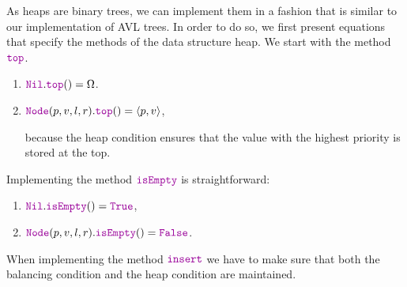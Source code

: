 As heaps are binary trees, we can implement them in a fashion that is similar to our implementation
of AVL trees.  In order to do so, we first present equations that specify the methods of the data
structure heap.  We start with the method $\mytt{top}$.  
\begin{enumerate}
\item $\mytt{Nil}.\mytt{top}() = \Omega$.
\item $\mytt{Node}(p,v,l,r).\mytt{top}() = \pair(p,v)$,

      because the heap condition ensures that the value with the highest priority is stored at the
      top. 
\end{enumerate}
Implementing the method $\mytt{isEmpty}$ is straightforward:
\begin{enumerate}
\item $\mytt{Nil}.\mytt{isEmpty}() = \mytt{True}$,
\item $\mytt{Node}(p,v,l,r).\mytt{isEmpty}() = \mytt{False}$.
\end{enumerate}
When  implementing the method $\mytt{insert}$ we have to make sure that both the balancing condition
and the heap condition are maintained.
